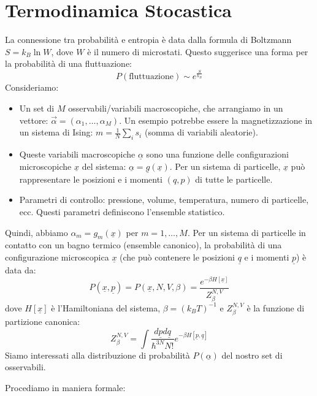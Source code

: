 \section{Termodinamica Stocastica}
La connessione tra probabilità e entropia è data dalla formula di Boltzmann $S=k_{B}\ln W$, dove $W$ è il numero di microstati. Questo suggerisce una forma per la probabilità di una fluttuazione:
\begin{equation}
P(\text{fluttuazione}) \sim e^{\frac{S}{k_{B}}}
\end{equation}
Consideriamo:
\begin{itemize}
    \item Un set di $M$ osservabili/variabili macroscopiche, che arrangiamo in un vettore: $\vec{\alpha} = (\alpha_{1},\dots,\alpha_{M})$.  Un esempio potrebbe essere la magnetizzazione in un sistema di Ising: $m=\frac{1}{N}\sum_{i}s_{i}$ (somma di variabili aleatorie).
    \item Queste variabili macroscopiche $\underline{\alpha}$ sono una funzione delle configurazioni microscopiche $\underline{x}$ del sistema: $\underline{\alpha} = \underline{g}(\underline{x})$. Per un sistema di particelle, $\underline{x}$ può rappresentare le posizioni e i momenti $(q,p)$ di tutte le particelle.
    \item Parametri di controllo: pressione, volume, temperatura, numero di particelle, ecc. Questi parametri definiscono l'ensemble statistico.
\end{itemize}
Quindi, abbiamo $\alpha_m = g_m(\underline{x})$ per $m=1,\dots,M$.
Per un sistema di particelle in contatto con un bagno termico (ensemble canonico), la probabilità di una configurazione microscopica $\underline{x}$ (che può contenere le posizioni $\underline{q}$ e i momenti $\underline{p}$) è data da:
\begin{equation}
P(\underline{x},\underline{p}) = P(\underline{x}, N, V, \beta) = \frac{e^{-\beta H[\underline{x}]}}{Z_{\beta}^{N,V}}
\end{equation}
dove $H[\underline{x}] $ è l'Hamiltoniana del sistema, $\beta = (k_B T)^{-1}$ e $Z_{\beta}^{N,V}$ è la funzione di partizione canonica:
\begin{equation}
Z_{\beta}^{N,V}=\int\frac{d\underline{p}d\underline{q}}{\hbar^{3N}N!}e^{-\beta H[\underline{p},\underline{q}]}
\end{equation}
Siamo interessati alla distribuzione di probabilità $P(\underline{\alpha})$ del nostro set di osservabili.

\noindent Procediamo in maniera formale:

